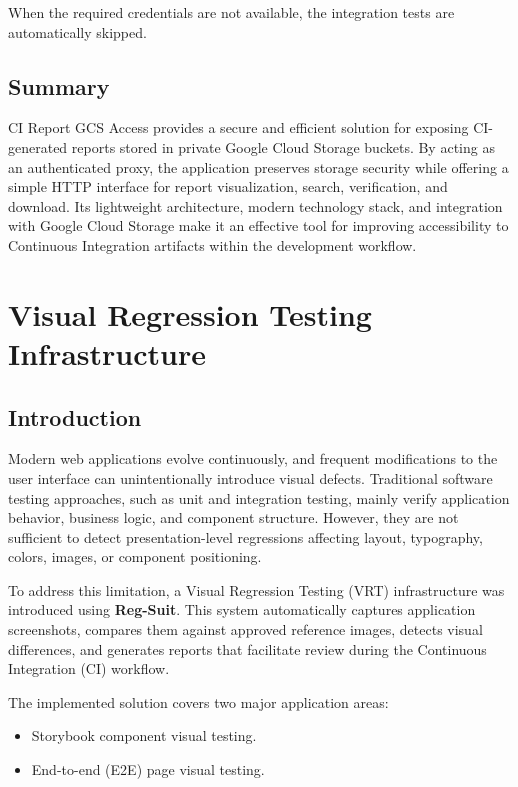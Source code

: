 When the required credentials are not available, the integration tests are automatically skipped.

\subsection{Summary}

CI Report GCS Access provides a secure and efficient solution for exposing CI-generated reports stored in private Google Cloud Storage buckets. By acting as an authenticated proxy, the application preserves storage security while offering a simple HTTP interface for report visualization, search, verification, and download. Its lightweight architecture, modern technology stack, and integration with Google Cloud Storage make it an effective tool for improving accessibility to Continuous Integration artifacts within the development workflow.


\section{Visual Regression Testing Infrastructure}

\subsection{Introduction}

Modern web applications evolve continuously, and frequent modifications to the user interface can unintentionally introduce visual defects. Traditional software testing approaches, such as unit and integration testing, mainly verify application behavior, business logic, and component structure. However, they are not sufficient to detect presentation-level regressions affecting layout, typography, colors, images, or component positioning.

To address this limitation, a Visual Regression Testing (VRT) infrastructure was introduced using \textbf{Reg-Suit}. This system automatically captures application screenshots, compares them against approved reference images, detects visual differences, and generates reports that facilitate review during the Continuous Integration (CI) workflow.

The implemented solution covers two major application areas:

\begin{itemize}
    \item Storybook component visual testing.
    \item End-to-end (E2E) page visual testing.
\end{itemize}


